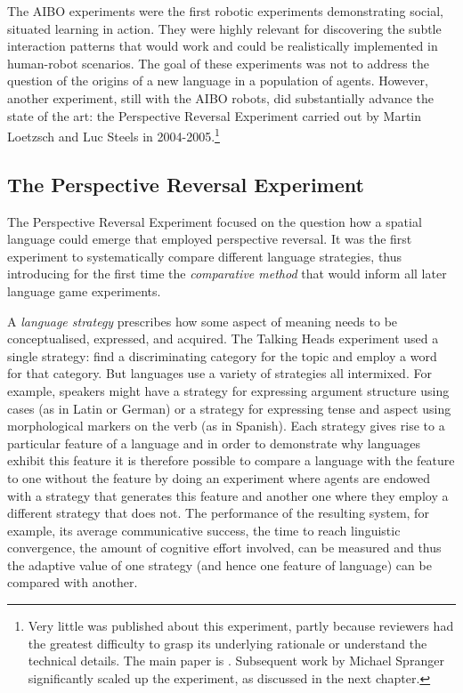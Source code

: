 The AIBO experiments were the first robotic experiments demonstrating social, situated learning in action. 
They were highly relevant for discovering the subtle interaction patterns that would work and 
could be realistically implemented in human-robot scenarios. The goal of these experiments was 
not to address the question of the origins of a 
new language in a population of agents. However, another experiment, still with the AIBO robots,  
did substantially advance the state of the art: the Perspective Reversal Experiment carried out by Martin Loetzsch 
and Luc Steels in 2004-2005.\footnote{
Very little was published about this experiment, partly because reviewers had the greatest difficulty to grasp 
its underlying rationale or understand the technical details. The main paper is \cite{Steels:2008spatial}. 
Subsequent work by Michael Spranger significantly scaled up the experiment, as discussed in the next chapter.}

\subsection{The Perspective Reversal Experiment}

The Perspective Reversal Experiment  focused on the question how a spatial language could emerge that employed
perspective reversal. It was the first experiment to systematically compare different language strategies, thus 
introducing for the first time the {\itshape comparative method}  
that would inform all later language game experiments. 

A {\itshape language strategy}  
prescribes how some aspect of meaning needs to be conceptualised, expressed, and acquired. 
The Talking Heads experiment used a single strategy: find a discriminating category for the topic and employ a word 
for that category. But languages use a variety of strategies all intermixed. 
For example, speakers might have a strategy for expressing argument structure using cases (as in Latin or German) or 
a strategy for expressing tense and aspect using morphological markers on the verb (as in Spanish). Each strategy gives 
rise to a particular feature of a language and in order to demonstrate why languages exhibit this feature it is therefore
possible to compare a language with the feature to one without the feature by doing an experiment where
agents are endowed with a strategy that generates this feature and another one where they employ a different strategy
that does not. The performance of the resulting system, for example, its average communicative success, the time to reach 
linguistic convergence, the amount of cognitive effort involved, can be measured and thus the adaptive value of one 
strategy (and hence one feature of language) can be compared with another. 

